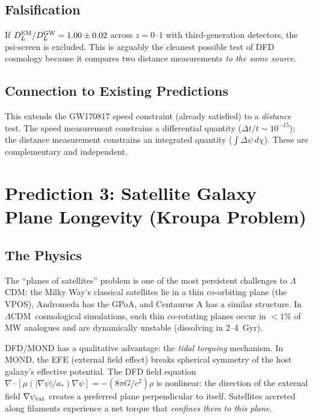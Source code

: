 \documentclass[11pt]{article}
\newcommand{\LCDM}{$\Lambda$CDM}
\begin{document}
\subsection{Falsification}

If $D_L^{\rm EM}/D_L^{\rm GW} = 1.00 \pm 0.02$ across $z = 0$--$1$
with third-generation detectors, the psi-screen is excluded.  This is
arguably the cleanest possible test of DFD cosmology because it compares
two distance measurements \emph{to the same source}.

\subsection{Connection to Existing Predictions}

This extends the GW170817 speed constraint (already satisfied) to a
\emph{distance} test.  The speed measurement constrains a differential
quantity ($\Delta t / t \sim 10^{-15}$); the distance measurement
constrains an integrated quantity ($\int \Delta\psi\,d\chi$).
These are complementary and independent.

\section{Prediction 3: Satellite Galaxy Plane Longevity (Kroupa Problem)}
\label{sec:satellite-planes}

\subsection{The Physics}

The ``planes of satellites'' problem is one of the most persistent
challenges to \LCDM: the Milky Way's classical satellites lie in a thin
co-orbiting plane (the VPOS), Andromeda has the GPoA, and Centaurus A
has a similar structure.  In \LCDM\ cosmological simulations, such
thin co-rotating planes occur in $< 1\%$ of MW analogues and are
dynamically unstable (dissolving in 2--4~Gyr).

DFD/MOND has a qualitative advantage: the \emph{tidal torquing} mechanism.
In MOND, the EFE (external field effect) breaks spherical symmetry of the
host galaxy's effective potential.  The DFD field equation
$\nabla\cdot[\mu(|\nabla\psi|/a_*)\nabla\psi] = -(8\pi G/c^2)\rho$
is nonlinear: the direction of the external field $\nabla\psi_{\rm ext}$
creates a preferred plane perpendicular to itself.  Satellites accreted
along filaments experience a net torque that \emph{confines them to this
plane}.
\end{document}

